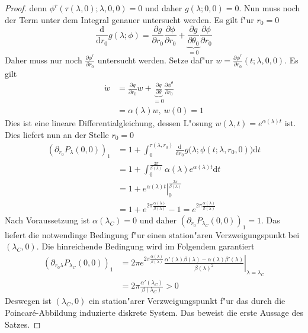 \documentclass[a4paper, 13pt]{scrreprt}
\theoremstyle{definition} \newtheorem{definition}{Definition}[section]
\begin{document}
\begin{proof}
denn $\phi^r(\tau(\lambda, 0);\lambda, 0, 0) = 0$ und daher $g(\lambda; 0, 0) = 0$. Nun muss noch der Term unter dem Integral genauer untersucht werden. Es gilt f"ur $r_0=0$
$$\frac{\mathrm d}{\mathrm dr_0} g(\lambda; \phi) = \frac{\partial g}{\partial r_0} \frac{\partial \phi}{\partial r_0} + \underbrace{\frac{\partial g}{\partial \theta_0}}_{=0}\frac{\partial \phi}{\partial r_0}$$
Daher muss nur noch $\frac{\partial \phi^r}{\partial r_0}$ untersucht werden. Setze daf"ur $w = \frac{\partial \phi^r}{\partial r_0}(t;\lambda, 0,0)$. Es gilt
\begin{align*}
\dot w &= \frac{\partial g}{\partial r_0} w + \underbrace{\frac{\partial g}{\partial \theta}}_{=0} \frac{\partial \phi^\theta}{\partial r_0} \\
 &=  \alpha(\lambda) w, \ w(0) = 1
\end{align*}
Dies ist eine lineare Differentialgleichung, dessen L"osung $w(\lambda, t) = e^{\alpha(\lambda)t}$ ist.
Dies liefert nun an der Stelle $r_0 = 0$
\begin{align*}
\left(\partial_{r_0} P_\lambda(0, 0)\right)_1 &= 1 + \int_0^{\tau(\lambda, r_0)}{\frac{\mathrm{d}}{\mathrm dr_0}g\bigl(\lambda; \phi(t; \lambda, r_0, 0)\bigr)\mathrm dt}\\
 &= 1 + \int_0^{\frac{2\pi}{\beta(\lambda)}}{\alpha(\lambda) e^{\alpha(\lambda) t} \mathrm dt} \\
 &= \left .1 + e^{\alpha(\lambda)t}\right |_{0}^{\frac{2\pi}{\beta(\lambda)}} \\
 &= 1 +  e^{2\pi\frac{\alpha(\lambda)}{\beta(\lambda)}} - 1 = e^{2\pi\frac{\alpha(\lambda)}{\beta(\lambda)}}
\end{align*}
Nach Voraussetzung ist $\alpha(\lambda_C) = 0$ und daher $\left(\partial_{r_0} P_{\lambda_C}(0, 0)\right)_1 = 1$. Das liefert die notwendinge Bedingung f"ur einen station"aren Verzweigungspunkt bei $(\lambda_C, 0)$. Die hinreichende Bedingung wird im Folgendem garantiert
\begin{align*}
\left(\partial_{r_0\lambda} P_{\lambda_C}(0, 0)\right)_1 &= \left . 2\pi e^{2 \pi \frac{\alpha(\lambda)}{\beta(\lambda)}} \frac{\alpha'(\lambda)\beta(\lambda)-\alpha(\lambda)\beta'(\lambda)}{\beta(\lambda)^2} \right |_{\lambda = \lambda_C} \\ 
 &= 2\pi \frac{\alpha'(\lambda_C)}{\beta(\lambda_C)} > 0
\end{align*}
Deswegen ist $(\lambda_C, 0)$ ein station"arer Verzweigungspunkt f"ur das durch die Poincar\'{e}-Abbildung induzierte diskrete System. Das beweist die erste Aussage des Satzes.
\end{proof}
\end{document}
